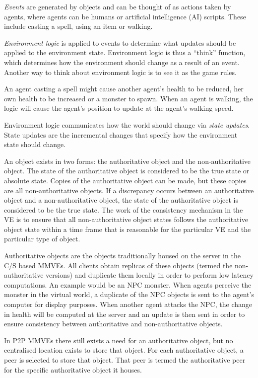 \emph{Events} are generated by objects and can be thought of as actions taken by agents, where agents can be humans or artificial intelligence (AI) scripts. These include casting a spell, using an item or walking.

\emph{Environment logic} is applied to events to determine what updates should be applied to the environment state. Environment logic is thus a ``think'' function, which determines how the environment should change as a result of an event. Another way to think about environment logic is to see it as the game rules.

An agent casting a spell might cause another agent's health to be reduced, her own health to be increased or a monster to spawn. When an agent is walking, the logic will cause the agent's position to update at the agent's walking speed.

Environment logic communicates how the world should change via \emph{state updates}. State updates are the incremental changes that specify how the environment state should change.

An object exists in two forms: the authoritative object and the non-authoritative object. The state of the authoritative object is considered to be the true state or absolute state. Copies of the authoritative object can be made, but these copies are all non-authoritative objects. If a discrepancy occurs between an authoritative object and a non-authoritative object, the state of the authoritative object is considered to be the true state. The work of the consistency mechanism in the VE is to ensure that all non-authoritative object states follows the authoritative object state within a time frame that is reasonable for the particular VE and the particular type of object.

Authoritative objects are the objects traditionally housed on the server in the C/S based MMVEs. All clients obtain replicas of these objects (termed the non-authoritative versions) and duplicate them locally in order to perform low latency computations. An example would be an NPC monster. When agents perceive the monster in the virtual world, a duplicate of the NPC objects is sent to the agent's computer for display purposes. When another agent attacks the NPC, the change in health will be computed at the server and an update is then sent in order to ensure consistency between authoritative and non-authoritative objects.

In P2P MMVEs there still exists a need for an authoritative object, but no centralised location exists to store that object. For each authoritative object, a peer is selected to store that object. That peer is termed the authoritative peer for the specific authoritative object it houses.

